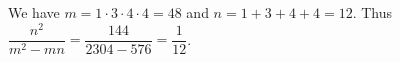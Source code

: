 We have $ m=1\cdot3\cdot4\cdot4=48 $ and $ n=1+3+4+4=12 $. Thus $\dfrac{n^2}{m^2-mn}=\dfrac{144}{2304-576}=\boxed{\dfrac{1}{12}}$.
